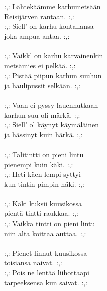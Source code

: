 
            :,: Lähtekäämme karhumetsään \\
            Reisijärven rantaan. :,: \\
            :,: Siell’ on karhu kontallansa \\
            joka ampua antaa. :,: \\
\hspace{10mm} \\
            :,: Vaikk’ on karhu karvainenkin \\
            metsämies ei pelkää. :,: \\
            :,: Pistää piipun karhun suuhun \\
            ja haulipussit selkään. :,: \\
\hspace{10mm} \\
            :,: Vaan ei pyssy lauennutkaan \\
            karhun suu oli märkä. :,: \\
            :,: Siell’ ol käynyt käymäläinen \\
            ja hässinyt kuin härkä. :,: \\
\hspace{10mm} \\
            :,: Talitintti on pieni lintu \\
            pienempi kuin käki. :,: \\
            :,: Heti käen lempi syttyi \\
            kun tintin pimpin näki. :,: \\
\hspace{10mm} \\
            :,: Käki kuksii kuusikossa \\
            pientä tintti raukkaa. :,: \\
            :,: Vaikka tintti on pieni lintu \\
            niin alta koittaa auttaa. :,: \\
\hspace{10mm} \\
            :,: Pienet linnut kuusikossa \\
            toisiansa naivat. :,: \\
            :,: Pois ne lentää liihottaapi \\
            tarpeeksensa kun saivat. :,: \\
